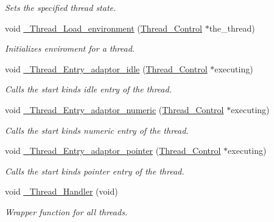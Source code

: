\begin{DoxyCompactItemize}
\begin{DoxyCompactList}\small\item\em Sets the specified thread state. \end{DoxyCompactList}\item 
void \mbox{\hyperlink{group__RTEMSScoreThread_gade10731d5bc6570cc485999da44acd43}{\+\_\+\+Thread\+\_\+\+Load\+\_\+environment}} (\mbox{\hyperlink{struct__Thread__Control}{Thread\+\_\+\+Control}} $\ast$the\+\_\+thread)
\begin{DoxyCompactList}\small\item\em Initializes enviroment for a thread. \end{DoxyCompactList}\item 
void \mbox{\hyperlink{group__RTEMSScoreThread_ga15433c1ca9df669c036739a50a8d1b9a}{\+\_\+\+Thread\+\_\+\+Entry\+\_\+adaptor\+\_\+idle}} (\mbox{\hyperlink{struct__Thread__Control}{Thread\+\_\+\+Control}} $\ast$executing)
\begin{DoxyCompactList}\small\item\em Calls the start kinds idle entry of the thread. \end{DoxyCompactList}\item 
void \mbox{\hyperlink{group__RTEMSScoreThread_ga9223b77920482b86fba30d4113be119f}{\+\_\+\+Thread\+\_\+\+Entry\+\_\+adaptor\+\_\+numeric}} (\mbox{\hyperlink{struct__Thread__Control}{Thread\+\_\+\+Control}} $\ast$executing)
\begin{DoxyCompactList}\small\item\em Calls the start kinds numeric entry of the thread. \end{DoxyCompactList}\item 
void \mbox{\hyperlink{group__RTEMSScoreThread_gaac2283a605738e5b3fd2e1710ea8b73a}{\+\_\+\+Thread\+\_\+\+Entry\+\_\+adaptor\+\_\+pointer}} (\mbox{\hyperlink{struct__Thread__Control}{Thread\+\_\+\+Control}} $\ast$executing)
\begin{DoxyCompactList}\small\item\em Calls the start kinds pointer entry of the thread. \end{DoxyCompactList}\item 
void \mbox{\hyperlink{group__RTEMSScoreThread_gae0c3a615798c7cc70dc9ff6d9317df46}{\+\_\+\+Thread\+\_\+\+Handler}} (void)
\begin{DoxyCompactList}\small\item\em Wrapper function for all threads. \end{DoxyCompactList}\item 

\end{DoxyCompactItemize}
